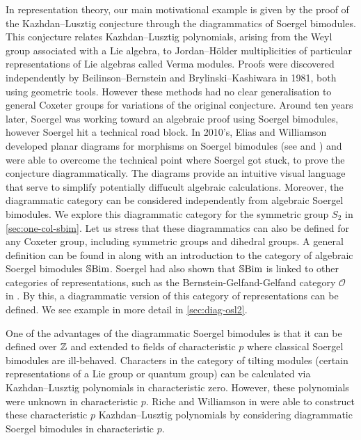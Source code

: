 In representation theory, our main motivational example is given by the proof of the Kazhdan--Lusztig conjecture through the diagrammatics of Soergel bimodules. This conjecture relates Kazhdan--Lusztig polynomials, arising from the Weyl group associated with a Lie algebra, to Jordan--H\"older multiplicities of particular representations of Lie algebras called Verma modules. Proofs were discovered independently by Beilinson--Bernstein and Brylinski--Kashiwara in 1981, both using geometric tools. However these methods had no clear generalisation to general Coxeter groups for variations of the original conjecture. Around ten years later, Soergel was working toward an algebraic proof using Soergel bimodules, however Soergel hit a technical road block. In 2010's, Elias and Williamson developed planar diagrams for morphisms on Soergel bimodules (see \cite{hodge-theory-of-soergel-bimodules} and \cite{diagrammatics-for-soergel-categories}) and were able to overcome the technical point where Soergel got stuck, to prove the conjecture diagrammatically. The diagrams provide an intuitive visual language that serve to simplify potentially diffucult algebraic calculations. Moreover, the diagrammatic category can be considered independently from algebraic Soergel bimodules. We explore this diagrammatic category for the symmetric group $S_2$ in \autoref{sec:one-col-sbim}. Let us stress that these diagrammatics can also be defined for any Coxeter group, including symmetric groups and dihedral groups. A general definition can be found in \cite{intro-soergel-bimodules} along with an introduction to the category of algebraic Soergel bimodules $\operatorname{\mathbb{S}Bim}$. Soergel had also shown that $\operatorname{\mathbb{S}Bim}$ is linked to other categories of representations, such as the Bernstein-Gelfand-Gelfand category $\mathcal{O}$ in \cite{soergel-category-O}. By this, a diagrammatic version of this category of representations can be defined. We see example in more detail in \autoref{sec:diag-osl2}.

One of the advantages of the diagrammatic Soergel bimodules is that it can be defined over $\mathbb{Z}$ and extended to fields of characteristic $p$ where classical Soergel bimodules are ill-behaved. Characters in the category of tilting modules (certain representations of a Lie group or quantum group) can be calculated via Kazhdan--Lusztig polynomials in characteristic zero. However, these polynomials were unknown in characteristic $p$. Riche and Williamson in \cite{riche-williamson-tilt-modules-p-canon-basis} were able to construct these characteristic $p$ Kazhdan--Lusztig polynomials by considering diagrammatic Soergel bimodules in characteristic $p$.

